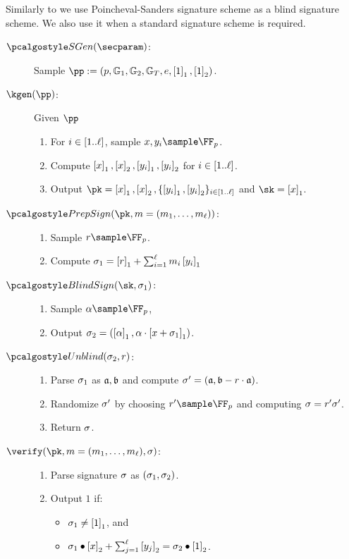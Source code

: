 \documentclass[runningheads,10pt]{llncs}
\numberwithin{equation}{section}
\begin{document}
Similarly to \cite{EPRINT:DGKOS20} we use Poincheval-Sanders
\cite{RSA:PoiSan16} signature scheme as a blind signature scheme. We also use
it when a standard signature scheme is required.
\begin{description}
  \item[$\sgen(\secparam)$:] Sample $\pp := (p, \GRP_1, \GRP_2, \GRP_T, \pair,
    \gone{1}, \gtwo{1})$.
  \item[$\kgen(\pp)$:] Given $\pp$
    \begin{enumerate}
    \item For $i \in [1 .. \ell]$, sample $x, y_i \sample \FF_p$.
    \item Compute $\left[x \right]_{1}, \left[x \right]_{2}, \left[y_i \right]_{1}, \left[y_i \right]_{2}$ for $i \in
    [1 .. \ell]$.
    \item Output $\pk = \gone{x}, \gtwo{x}, \smallset{\gone{y_i},
      \gtwo{y_i}}_{i \in \range{1}{\ell}}$ and $\sk = \gone{x}$.
    \end{enumerate}
  \item[$\prepsign(\pk , m = (m_1, \ldots, m_\ell))$:]
    \begin{enumerate}
    \item Sample $r \sample \FF_p$.
    \item Compute $\sigma_1 = \left[r \right]_{1} + \sum_{i = 1}^{\ell} m_i
    \left[y_i \right]_{1}$
    \end{enumerate}
  \item[$\blindsign(\sk, \signature_1)$:]
    \begin{enumerate}
    \item Sample $\alpha \sample \FF_p$,
    \item Output $\sigma_2 = (\left[\alpha \right]_{1}, \alpha \cdot \left[x +
    \sigma_1 \right]_{1})$.
    \end{enumerate}
  \item[$\unblind(\signature_2, r)$:]
    \begin{enumerate}
    \item Parse $\sigma_1$ as $\mathfrak{a}, \mathfrak{b}$ and compute $\sigma' =
      (\mathfrak{a}, \mathfrak{b} - r \cdot \mathfrak{a})$.
    \item Randomize $\sigma'$ by choosing $r' \sample \FF_p$ and computing
      $\sigma = r' \sigma'$.
    \item Return $\sigma$.
    \end{enumerate}
  \item[$\verify(\pk, m = (m_1, \ldots, m_\ell), \signature)$:]
    \begin{enumerate}
    \item Parse signature $\sigma$ as $(\sigma_1, \sigma_2)$.
    \item Output $1$ if:
      \begin{itemize}
      \item $\sigma_1 \neq \left[1 \right]_{1}$, and
      \item $\sigma_1 \bullet \left[x \right]_{2} + \sum_{j = 1}^{\ell}\left[y_j \right]_{2} =
        \sigma_2 \bullet \left[1 \right]_{2}$.
      \end{itemize}
    \end{enumerate}
\end{description}
\end{document}
